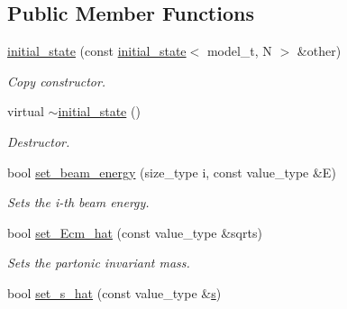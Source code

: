 \subsection*{Public Member Functions}
\begin{DoxyCompactItemize}
\item 
\hypertarget{a00308_a299129496429ce21025664f4c66d9162}{}\hyperlink{a00308_a299129496429ce21025664f4c66d9162}{initial\+\_\+state} (const \hyperlink{a00308}{initial\+\_\+state}$<$ model\+\_\+t, N $>$ \&other)\label{a00308_a299129496429ce21025664f4c66d9162}

\begin{DoxyCompactList}\small\item\em Copy constructor. \end{DoxyCompactList}\item 
\hypertarget{a00308_ac46117175110b3d84fd7ae58a4cb2197}{}virtual \hyperlink{a00308_ac46117175110b3d84fd7ae58a4cb2197}{$\sim$initial\+\_\+state} ()\label{a00308_ac46117175110b3d84fd7ae58a4cb2197}

\begin{DoxyCompactList}\small\item\em Destructor. \end{DoxyCompactList}\item 
\hypertarget{a00308_a89a407740ec37bb376b90fe4c99111bc}{}bool \hyperlink{a00308_a89a407740ec37bb376b90fe4c99111bc}{set\+\_\+beam\+\_\+energy} (size\+\_\+type i, const value\+\_\+type \&E)\label{a00308_a89a407740ec37bb376b90fe4c99111bc}

\begin{DoxyCompactList}\small\item\em Sets the i-\/th beam energy. \end{DoxyCompactList}\item 
\hypertarget{a00308_a59bd8c60ac447b66745a72868ae6b92c}{}bool \hyperlink{a00308_a59bd8c60ac447b66745a72868ae6b92c}{set\+\_\+\+Ecm\+\_\+hat} (const value\+\_\+type \&sqrts)\label{a00308_a59bd8c60ac447b66745a72868ae6b92c}

\begin{DoxyCompactList}\small\item\em Sets the partonic invariant mass. \end{DoxyCompactList}\item 
\hypertarget{a00308_a2f27a98319a0ffe3e77ddb5166a99ed8}{}bool \hyperlink{a00308_a2f27a98319a0ffe3e77ddb5166a99ed8}{set\+\_\+s\+\_\+hat} (const value\+\_\+type \&\hyperlink{a00308_ae2984255cbdaabc293b8168d93c767bf}{s})\label{a00308_a2f27a98319a0ffe3e77ddb5166a99ed8}


\end{DoxyCompactItemize}
